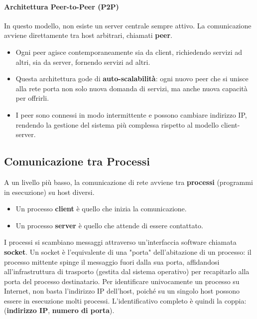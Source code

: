 \paragraph{Architettura Peer-to-Peer (P2P)}
In questo modello, non esiste un server centrale sempre attivo. La comunicazione avviene direttamente tra host arbitrari, chiamati \textbf{peer}.
\begin{itemize}
    \item Ogni peer agisce contemporaneamente sia da client, richiedendo servizi ad altri, sia da server, fornendo servizi ad altri.
    \item Questa architettura gode di \textbf{auto-scalabilità}: ogni nuovo peer che si unisce alla rete porta non solo nuova domanda di servizi, ma anche nuova capacità per offrirli.
    \item I peer sono connessi in modo intermittente e possono cambiare indirizzo IP, rendendo la gestione del sistema più complessa rispetto al modello client-server.
\end{itemize}

\subsection{Comunicazione tra Processi}
A un livello più basso, la comunicazione di rete avviene tra \textbf{processi} (programmi in esecuzione) su host diversi.
\begin{itemize}
    \item Un processo \textbf{client} è quello che inizia la comunicazione.
    \item Un processo \textbf{server} è quello che attende di essere contattato.
\end{itemize}
I processi si scambiano messaggi attraverso un'interfaccia software chiamata \textbf{socket}. Un socket è l'equivalente di una "porta" dell'abitazione di un processo: il processo mittente spinge il messaggio fuori dalla sua porta, affidandosi all'infrastruttura di trasporto (gestita dal sistema operativo) per recapitarlo alla porta del processo destinatario. Per identificare univocamente un processo su Internet, non basta l'indirizzo IP dell'host, poiché su un singolo host possono essere in esecuzione molti processi. L'identificativo completo è quindi la coppia: (\textbf{indirizzo IP}, \textbf{numero di porta}).

